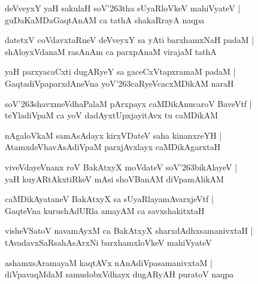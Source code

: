 \documentclass[twoside,12pt,openright]{book}
\def\S{\char'263}
\newcounter{shloka}[chapter]
\begin{document}
\begin{shloka}%
deVveyxY yaH sakulaH soV\S tha sUyaRloVkeV mahiVyateV |\\
guDaKaMDaGaqtAnAM ca tathA shakaRrayA naqpa
\end{shloka}

\begin{shloka}%
datetxV coVdavxtaRneV deVveyxY sa yAti barxhamxNaH padaM |\\
shAloyxVdanaM rasAnAm ca parxpAnaM virajaM tathA
\end{shloka}

\begin{shloka}%
yaH parxyacaCxti dugARyeY sa gaceCxVtapxramaM padaM |\\
GaqtadiVpaparxdAneVna yoV\S caRyeVcacxMDikAM naraH 
\end{shloka}

\begin{shloka}%
soV\S shavxmeVdhaPalaM pArxpayx caMDikAnucaroV BaveVtf |\\
teYladiVpaM ca yoV dadAyxtUpxjayitAvx tu caMDikAM 
\end{shloka}

\begin{shloka}%
nAgaloVkaM samAsAdayx kirxVDateV saha kinanxreYH |\\
AtamxdeVhavAsAdiVpaM parxjAvxlayx caMDikAgarxtaH 
\end{shloka}

\begin{shloka}%
viveVdayeVnanx roV BakAtxyX moVdateV soV\S bikAlayeV |\\
yaH kuyARtAkxtiRkeV mAsi shoVBanAM diVpamAlikAM 
\end{shloka}

\begin{shloka}%
caMDikAyataneV BakAtxyX sa sUyaRlayamAvarxjeVtf |\\
GaqteVna kurushAdURla amayAM ca savxshakitxtaH
\end{shloka}

\begin{shloka}%
visheVSatoV navamAyxM ca BakAtxyX sharxdAdhxsamanivxtaH |\\
tAvadavxSaRsahAsArxNi barxhamxloVkeV mahiVyateV 
\end{shloka}

\begin{shloka}%
ashamxsAramayaM kaqtAVx nAnAdiVpasamanivxtaM |\\
diVpavaqMdaM samudobxVdhayx dugARyAH puratoV naqpa 
\end{shloka}
\end{document}
